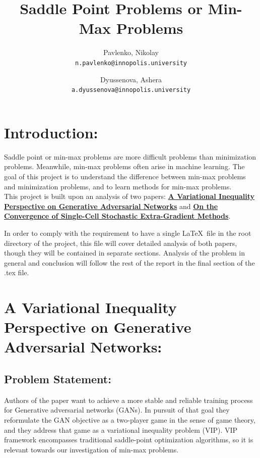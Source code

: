 \documentclass[11pt]{article}
\title{Saddle Point Problems or Min-Max Problems}
\date{}
\author{
	Pavlenko, Nikolay\\
	\texttt{n.pavlenko@innopolis.university}
	\and
	Dyussenova, Ashera\\
	\texttt{a.dyussenova@innopolis.university}
}
\begin{document}
\maketitle

\section*{Introduction:}

Saddle point or min-max problems are more difficult problems than minimization problems. Meanwhile, min-max problems often arise in machine learning. The goal of this project is to understand the difference between min-max problems and minimization problems, and to learn methods for min-max problems. \\

This project is built upon an analysis of two papers: \href{https://openreview.net/pdf?id=r1laEnA5Ym}{\textbf{A Variational Inequality Perspective on Generative Adversarial Networks}} and \href{https://proceedings.neurips.cc/paper/2019/file/4625d8e31dad7d1c4c83399a6eb62f0c-Paper.pdf}{\textbf{On the Convergence of Single-Cell Stochastic Extra-Gradient Methods}}.

In order to comply with the requirement to have a single \LaTeX\ file in the root directory of the project, this file will cover detailed analysis of both papers, though they will be contained in separate sections. Analysis of the problem in general and conclusion will follow the rest of the report in the final section of the .tex file.

\section{A Variational Inequality Perspective on Generative Adversarial Networks:}

	\subsection{Problem Statement:}
	Authors of the paper want to achieve a more stable and reliable training process for Generative adversarial networks (GANs). In pursuit of that goal they reformulate the GAN objective as a two-player game in the sense of game theory, and they address that game as a variational inequality problem (VIP). VIP framework encompasses traditional saddle-point optimization algorithms, so it is relevant towards our investigation of min-max problems. \\
	
\end{document}
